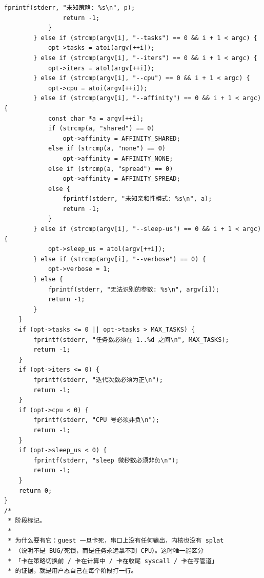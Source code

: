 \documentclass[10pt,a4paper]{article}
\newenvironment{yatpage}{\vspace*{0pt}}{\par}
\begin{document}
\begin{yatpage}
\begin{Verbatim}[fontsize=\fontsize{8.2}{9.8}\selectfont]
				fprintf(stderr, "未知策略: %s\n", p);
				return -1;
			}
		} else if (strcmp(argv[i], "--tasks") == 0 && i + 1 < argc) {
			opt->tasks = atoi(argv[++i]);
		} else if (strcmp(argv[i], "--iters") == 0 && i + 1 < argc) {
			opt->iters = atol(argv[++i]);
		} else if (strcmp(argv[i], "--cpu") == 0 && i + 1 < argc) {
			opt->cpu = atoi(argv[++i]);
		} else if (strcmp(argv[i], "--affinity") == 0 && i + 1 < argc) {
			const char *a = argv[++i];
			if (strcmp(a, "shared") == 0)
				opt->affinity = AFFINITY_SHARED;
			else if (strcmp(a, "none") == 0)
				opt->affinity = AFFINITY_NONE;
			else if (strcmp(a, "spread") == 0)
				opt->affinity = AFFINITY_SPREAD;
			else {
				fprintf(stderr, "未知亲和性模式: %s\n", a);
				return -1;
			}
		} else if (strcmp(argv[i], "--sleep-us") == 0 && i + 1 < argc) {
			opt->sleep_us = atol(argv[++i]);
		} else if (strcmp(argv[i], "--verbose") == 0) {
			opt->verbose = 1;
		} else {
			fprintf(stderr, "无法识别的参数: %s\n", argv[i]);
			return -1;
		}
	}
	if (opt->tasks <= 0 || opt->tasks > MAX_TASKS) {
		fprintf(stderr, "任务数必须在 1..%d 之间\n", MAX_TASKS);
		return -1;
	}
	if (opt->iters <= 0) {
		fprintf(stderr, "迭代次数必须为正\n");
		return -1;
	}
	if (opt->cpu < 0) {
		fprintf(stderr, "CPU 号必须非负\n");
		return -1;
	}
	if (opt->sleep_us < 0) {
		fprintf(stderr, "sleep 微秒数必须非负\n");
		return -1;
	}
	return 0;
}
/*
 * 阶段标记。
 *
 * 为什么要有它：guest 一旦卡死，串口上没有任何输出，内核也没有 splat
 * （说明不是 BUG/死锁，而是任务永远拿不到 CPU）。这时唯一能区分
 * 「卡在策略切换前 / 卡在计算中 / 卡在收尾 syscall / 卡在写管道」
 * 的证据，就是用户态自己在每个阶段打一行。
\end{Verbatim}
\end{yatpage}
\newpage
\end{document}
